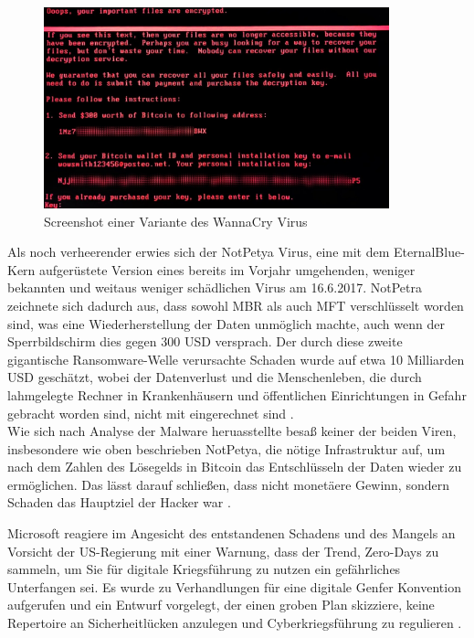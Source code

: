 \documentclass[DIV=12,headings=normal,pdftex,headinclude=false,footinclude=false,final]{scrreprt}
\begin{document}
\begin{figure}[H]
    \centering
    \includegraphics[width=10cm]{notpetya_ransomware.jpg}
    \caption[NotPetya Screenshot, Nutzer ''GrEat''/Kaspersky, URL: <https://media.kasperskydaily.com/wp-content/uploads/sites/92/2017/06/27133735/wannamore-ransomware-screenshot.jpg>]{Screenshot einer Variante des WannaCry Virus}
    \label{img:not_petya}
\end{figure}

\noindent
Als noch verheerender erwies sich der NotPetya Virus, eine mit dem EternalBlue-Kern aufgerüstete Version eines bereits im Vorjahr umgehenden, weniger bekannten und weitaus weniger schädlichen Virus am 16.6.2017. NotPetra zeichnete sich dadurch aus, dass sowohl MBR als auch MFT verschlüsselt worden sind, was eine Wiederherstellung der Daten unmöglich machte, auch wenn der Sperrbildschirm dies gegen 300 USD versprach. Der durch diese zweite gigantische Ransomware-Welle verursachte Schaden wurde auf etwa 10 Milliarden USD geschätzt, wobei der Datenverlust und die Menschenleben, die durch lahmgelegte Rechner in Krankenhäusern und öffentlichen Einrichtungen in Gefahr gebracht worden sind, nicht mit eingerechnet sind \cite{Avast}.\\
Wie sich nach Analyse der Malware heruasstellte besaß keiner der beiden Viren, insbesondere wie oben beschrieben NotPetya, die nötige Infrastruktur auf, um nach dem Zahlen des Lösegelds in Bitcoin das Entschlüsseln der Daten wieder zu ermöglichen. Das lässt darauf schließen, dass nicht monetäere Gewinn, sondern Schaden das Hauptziel der Hacker war \cite{Sil}.


\noindent
Microsoft reagiere im Angesicht des entstandenen Schadens und des Mangels an Vorsicht der US-Regierung mit einer Warnung, dass der Trend, Zero-Days zu sammeln, um Sie für digitale Kriegsführung zu nutzen ein gefährliches Unterfangen sei. Es wurde zu Verhandlungen für eine digitale Genfer Konvention aufgerufen und ein Entwurf vorgelegt, der einen groben Plan skizziere, keine Repertoire an Sicherheitlücken anzulegen und Cyberkriegsführung zu regulieren \cite{MS:EB}.
\end{document}
